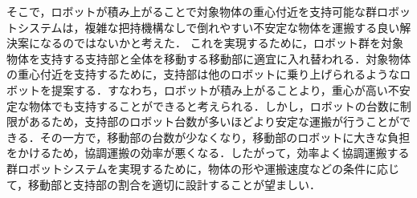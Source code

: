 そこで，ロボットが積み上がることで対象物体の重心付近を支持可能な群ロボットシステムは，複雑な把持機構なしで倒れやすい不安定な物体を運搬する良い解決案になるのではないかと考えた．
これを実現するために，ロボット群を対象物体を支持する支持部と全体を移動する移動部に適宜に入れ替われる．対象物体の重心付近を支持するために，支持部は他のロボットに乗り上げられるようなロボットを提案する．すなわち，ロボットが積み上がることより，重心が高い不安定な物体でも支持することができると考えられる．しかし，ロボットの台数に制限があるため，支持部のロボット台数が多いほどより安定な運搬が行うことができる．その一方で，移動部の台数が少なくなり，移動部のロボットに大きな負担をかけるため，協調運搬の効率が悪くなる．したがって，効率よく協調運搬する群ロボットシステムを実現するために，物体の形や運搬速度などの条件に応じて，移動部と支持部の割合を適切に設計することが望ましい．

